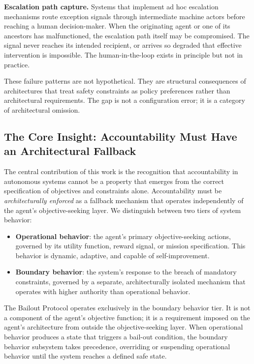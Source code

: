 \textbf{Escalation path capture.} Systems that implement ad hoc escalation mechanisms route exception signals through intermediate machine actors before reaching a human decision-maker. When the originating agent or one of its ancestors has malfunctioned, the escalation path itself may be compromised. The signal never reaches its intended recipient, or arrives so degraded that effective intervention is impossible. The human-in-the-loop exists in principle but not in practice.

These failure patterns are not hypothetical. They are structural consequences of architectures that treat safety constraints as policy preferences rather than architectural requirements. The gap is not a configuration error; it is a category of architectural omission.

\subsection{The Core Insight: Accountability Must Have an Architectural Fallback}
\label{sec:core-insight}

The central contribution of this work is the recognition that accountability in autonomous systems cannot be a property that emerges from the correct specification of objectives and constraints alone. Accountability must be \textit{architecturally enforced} as a fallback mechanism that operates independently of the agent's objective-seeking layer. We distinguish between two tiers of system behavior:

\begin{itemize}
\item \textbf{Operational behavior}: the agent's primary objective-seeking actions, governed by its utility function, reward signal, or mission specification. This behavior is dynamic, adaptive, and capable of self-improvement.
\item \textbf{Boundary behavior}: the system's response to the breach of mandatory constraints, governed by a separate, architecturally isolated mechanism that operates with higher authority than operational behavior.
\end{itemize}

The Bailout Protocol operates exclusively in the boundary behavior tier. It is not a component of the agent's objective function; it is a requirement imposed on the agent's architecture from outside the objective-seeking layer. When operational behavior produces a state that triggers a bail-out condition, the boundary behavior subsystem takes precedence, overriding or suspending operational behavior until the system reaches a defined safe state.

